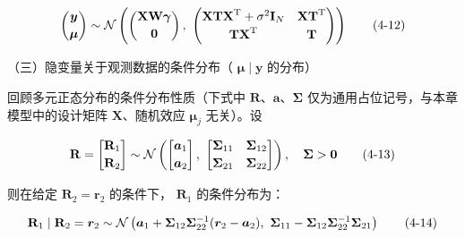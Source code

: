 \documentclass[12pt,a4paper]{ctexart}
\makeatletter
\numberwithin{figure}{section}
\numberwithin{table}{section}
\let\ltx@orig@tag\tag
\renewcommand{\tag}[1]{\refstepcounter{equation}\ltx@orig@tag{#1}}%
\makeatother
\begin{document}
\begin{equation}
\begin{pmatrix}\boldsymbol{y}\\[2pt]\boldsymbol{\mu}\end{pmatrix}\sim\mathcal{N}\left(\begin{pmatrix}\mathbf{XW}\boldsymbol{\gamma}\\[2pt]\mathbf{0}\end{pmatrix},\ \begin{pmatrix}\mathbf{XTX}^{\mathrm{T}}+\sigma^{2}\mathbf{I}_{N} & \mathbf{XT}^{\mathrm{T}}\\[2pt]\mathbf{TX}^{\mathrm{T}} & \mathbf{T}\end{pmatrix}\right) \tag{4-12}
\end{equation}

（三）隐变量关于观测数据的条件分布（ $\boldsymbol{\mu}\mid\boldsymbol{y}$ 的分布）

回顾多元正态分布的条件分布性质（下式中 $\mathbf{R}$、$\boldsymbol{a}$、$\boldsymbol{\Sigma}$ 仅为通用占位记号，与本章模型中的设计矩阵 $\mathbf{X}$、随机效应 $\boldsymbol{\mu}_j$ 无关）。设

\begin{equation}
\mathbf{R}=\begin{bmatrix}\mathbf{R}_{1}\\[2pt]\mathbf{R}_{2}\end{bmatrix}\sim\mathcal{N}\left(\begin{bmatrix}\boldsymbol{a}_{1}\\[2pt]\boldsymbol{a}_{2}\end{bmatrix},\ \begin{bmatrix}\boldsymbol{\Sigma}_{11} & \boldsymbol{\Sigma}_{12}\\[2pt]\boldsymbol{\Sigma}_{21} & \boldsymbol{\Sigma}_{22}\end{bmatrix}\right),\quad \boldsymbol{\Sigma}>\mathbf{0} \tag{4-13}
\end{equation}

则在给定 $\mathbf{R}_{2}=\boldsymbol{r}_{2}$ 的条件下， $\mathbf{R}_{1}$ 的条件分布为：

\begin{equation}
\mathbf{R}_{1}\mid \mathbf{R}_{2}=\boldsymbol{r}_{2}\sim\mathcal{N}\left(\boldsymbol{a}_{1}+\boldsymbol{\Sigma}_{12}\boldsymbol{\Sigma}_{22}^{-1}(\boldsymbol{r}_{2}-\boldsymbol{a}_{2}),\ \boldsymbol{\Sigma}_{11}-\boldsymbol{\Sigma}_{12}\boldsymbol{\Sigma}_{22}^{-1}\boldsymbol{\Sigma}_{21}\right) \tag{4-14}
\end{equation}
\end{document}
